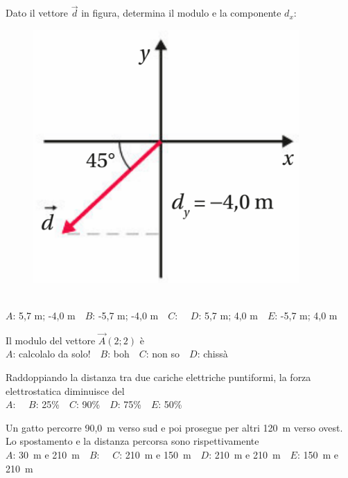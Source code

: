 \mcquestionheader Dato il vettore $\vec{d}$ in figura, determina il modulo e la componente $d_x$: \begin{figure}[h!]   \begin{center}     \includegraphics[scale=0.35]{vettored.png}   \end{center} \end{figure}\\
{$A$}: 5,7 m; -4,0 m\ \ {$B$}: -5,7 m; -4,0 m\ \ {$C$}: \ \ {$D$}: 5,7 m; 4,0 m\ \ {$E$}: -5,7 m; 4,0 m\ \ 

\mcquestionfooter



\def\mcquestionnumber{8}


\mcquestionheader Il modulo del vettore $\vec{A}(2;2)$ è\\
{$A$}: calcolalo da solo!\ \ {$B$}: boh\ \ {$C$}: non so\ \ {$D$}: chissà\ \ 

\mcquestionfooter



\def\mcquestionnumber{9}


\mcquestionheader Raddoppiando la distanza tra due cariche elettriche puntiformi, la forza elettrostatica diminuisce del\\
{$A$}: \ \ {$B$}: 25\%\ \ {$C$}: 90\%\ \ {$D$}: 75\%\ \ {$E$}: 50\%\ \ 

\mcquestionfooter



\def\mcquestionnumber{10}


\mcquestionheader Un gatto percorre 90,0~m verso sud e poi prosegue per altri 120~m verso ovest. Lo spostamento e la distanza percorsa sono rispettivamente\\
{$A$}: 30~m e 210~m\ \ {$B$}: \ \ {$C$}: 210~m e 150~m\ \ {$D$}: 210~m e 210~m\ \ {$E$}: 150~m e 210~m\ \ 

